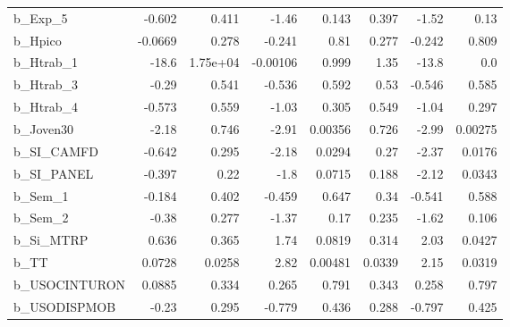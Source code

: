 \begin{tabular}{lrrrrrrr}
b\_Exp\_5       &  -0.602 &    0.411 &    -1.46 &    0.143 &         0.397 &        -1.52 &          0.13 \\
b\_Hpico       & -0.0669 &    0.278 &   -0.241 &     0.81 &         0.277 &       -0.242 &         0.809 \\
b\_Htrab\_1     &   -18.6 & 1.75e+04 & -0.00106 &    0.999 &          1.35 &        -13.8 &           0.0 \\
b\_Htrab\_3     &   -0.29 &    0.541 &   -0.536 &    0.592 &          0.53 &       -0.546 &         0.585 \\
b\_Htrab\_4     &  -0.573 &    0.559 &    -1.03 &    0.305 &         0.549 &        -1.04 &         0.297 \\
b\_Joven30     &   -2.18 &    0.746 &    -2.91 &  0.00356 &         0.726 &        -2.99 &       0.00275 \\
b\_SI\_CAMFD    &  -0.642 &    0.295 &    -2.18 &   0.0294 &          0.27 &        -2.37 &        0.0176 \\
b\_SI\_PANEL    &  -0.397 &     0.22 &     -1.8 &   0.0715 &         0.188 &        -2.12 &        0.0343 \\
b\_Sem\_1       &  -0.184 &    0.402 &   -0.459 &    0.647 &          0.34 &       -0.541 &         0.588 \\
b\_Sem\_2       &   -0.38 &    0.277 &    -1.37 &     0.17 &         0.235 &        -1.62 &         0.106 \\
b\_Si\_MTRP     &   0.636 &    0.365 &     1.74 &   0.0819 &         0.314 &         2.03 &        0.0427 \\
b\_TT          &  0.0728 &   0.0258 &     2.82 &  0.00481 &        0.0339 &         2.15 &        0.0319 \\
b\_USOCINTURON &  0.0885 &    0.334 &    0.265 &    0.791 &         0.343 &        0.258 &         0.797 \\
b\_USODISPMOB  &   -0.23 &    0.295 &   -0.779 &    0.436 &         0.288 &       -0.797 &         0.425 \\
\bottomrule
\end{tabular}

